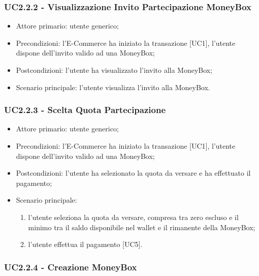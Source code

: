     \subsubsection{UC2.2.2 - Visualizzazione Invito Partecipazione MoneyBox}

    \begin{itemize}
    \item Attore primario: utente generico;
    \item Precondizioni: l'E-Commerce ha iniziato la transazione [UC1], l'utente dispone dell'invito valido ad una MoneyBox;
    \item Postcondizioni: l'utente ha visualizzato l'invito alla MoneyBox;
    \item Scenario principale: l'utente visualizza l'invito alla MoneyBox.
    \end{itemize}

    \subsubsection{UC2.2.3 - Scelta Quota Partecipazione}

    \begin{itemize}
    \item Attore primario: utente generico;
    \item Precondizioni: l'E-Commerce ha iniziato la transazione [UC1], l'utente dispone dell'invito valido ad una MoneyBox;
    \item Postcondizioni: l'utente ha selezionato la quota da versare e ha effettuato il pagamento;
    \item Scenario principale:
    \begin{enumerate}
        \item l'utente seleziona la quota da versare, compresa tra zero escluso e il minimo tra il saldo disponibile nel wallet e il rimanente della MoneyBox;
        \item l'utente effettua il pagamento [UC5].
    \end{enumerate}
    \end{itemize}

    \subsubsection{UC2.2.4 - Creazione MoneyBox}

